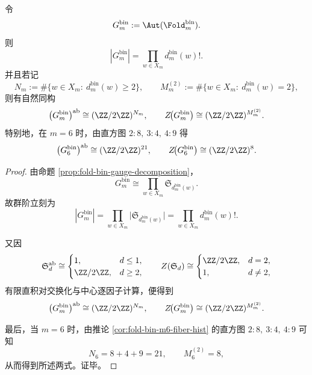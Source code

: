\begin{theorem}\label{thm:xi-foldbin-gauge-group-order-abel-center-closed}
令
\[
G_m^{\mathrm{bin}}:=\Aut(\Fold_m^{\mathrm{bin}}).
\]
则
\[
|G_m^{\mathrm{bin}}|
=
\prod_{w\in X_m}d_m^{\mathrm{bin}}(w)!.
\]
并且若记
\[
N_m:=\#\{w\in X_m:\ d_m^{\mathrm{bin}}(w)\ge 2\},
\qquad
M_m^{(2)}:=\#\{w\in X_m:\ d_m^{\mathrm{bin}}(w)=2\},
\]
则有自然同构
\[
\bigl(G_m^{\mathrm{bin}}\bigr)^{\mathrm{ab}}
\cong
(\ZZ/2\ZZ)^{N_m},
\qquad
Z\!\bigl(G_m^{\mathrm{bin}}\bigr)
\cong
(\ZZ/2\ZZ)^{M_m^{(2)}}.
\]
特别地，在 \(m=6\) 时，由直方图 \(2:8,\ 3:4,\ 4:9\) 得
\[
\bigl(G_6^{\mathrm{bin}}\bigr)^{\mathrm{ab}}\cong (\ZZ/2\ZZ)^{21},
\qquad
Z\!\bigl(G_6^{\mathrm{bin}}\bigr)\cong (\ZZ/2\ZZ)^8.
\]
\end{theorem}
\begin{proof}
由命题 \ref{prop:fold-bin-gauge-decomposition}，
\[
G_m^{\mathrm{bin}}
\cong
\prod_{w\in X_m}\mathfrak S_{d_m^{\mathrm{bin}}(w)}.
\]
故群阶立刻为
\[
|G_m^{\mathrm{bin}}|
=
\prod_{w\in X_m}\bigl|\mathfrak S_{d_m^{\mathrm{bin}}(w)}\bigr|
=
\prod_{w\in X_m}d_m^{\mathrm{bin}}(w)!.
\]

又因
\[
\mathfrak S_d^{\mathrm{ab}}\cong
\begin{cases}
1,& d\le 1,\\
\ZZ/2\ZZ,& d\ge 2,
\end{cases}
\qquad
Z(\mathfrak S_d)\cong
\begin{cases}
\ZZ/2\ZZ,& d=2,\\
1,& d\neq 2,
\end{cases}
\]
有限直积对交换化与中心逐因子计算，便得到
\[
\bigl(G_m^{\mathrm{bin}}\bigr)^{\mathrm{ab}}
\cong
(\ZZ/2\ZZ)^{N_m},
\qquad
Z\!\bigl(G_m^{\mathrm{bin}}\bigr)
\cong
(\ZZ/2\ZZ)^{M_m^{(2)}}.
\]

最后，当 \(m=6\) 时，由推论 \ref{cor:fold-bin-m6-fiber-hist} 的直方图 \(2:8,\ 3:4,\ 4:9\) 可知
\[
N_6=8+4+9=21,
\qquad
M_6^{(2)}=8,
\]
从而得到所述两式。证毕。
\end{proof}

